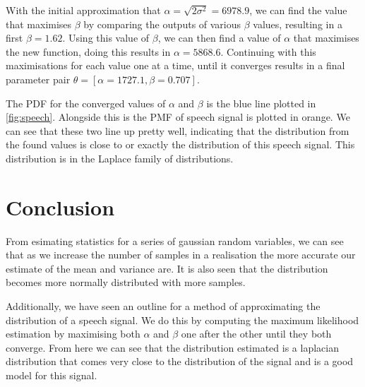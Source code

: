 \documentclass[a4paper, 12pt]{article}
\begin{document}
            With the initial approximation that $\alpha = \sqrt{2\sigma^2} = 6978.9$, we can find the value that maximises $\beta$ by comparing the outputs of various $\beta$ values, resulting in a first $\beta = 1.62$. Using this value of $\beta$, we can then find a value of $\alpha$ that maximises the new function, doing this results in $\alpha = 5868.6$. Continuing with this maximisations for each value one at a time, until it converges results in a final parameter pair $\theta = [\alpha = 1727.1, \beta = 0.707]$.
            \par
            The PDF for the converged values of $\alpha$ and $\beta$ is the blue line plotted in \cref{fig:speech}. Alongside this is the PMF of speech signal is plotted in orange. We can see that these two line up pretty well, indicating that the distribution from the found values is close to or exactly the distribution of this speech signal. This distribution is in the Laplace family of distributions.
            

    \section{Conclusion}
        From esimating statistics for a series of gaussian random variables, we can see that as we increase the number of samples in a realisation the more accurate our estimate of the mean and variance are. It is also seen that the distribution becomes more normally distributed with more samples.
        \par
        Additionally, we have seen an outline for a method of approximating the distribution of a speech signal. We do this by computing the maximum likelihood estimation by maximising both $\alpha$ and $\beta$ one after the other until they both converge. From here we can see that the distribution estimated is a laplacian distribution that comes very close to the distribution of the signal and is a good model for this signal.     


    
    
\end{document}

